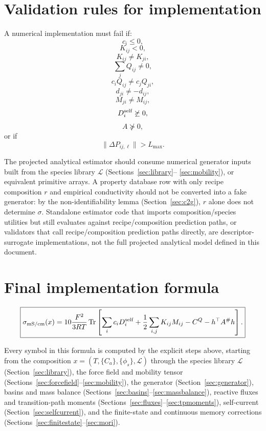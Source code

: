 \documentclass[11pt]{article}
\newcommand{\Tr}{\operatorname{Tr}}
\begin{document}
\section{Validation rules for implementation}

A numerical implementation must fail if:
\[
c_i\le0,
\]
\[
K_{ij}<0,
\]
\[
K_{ij}\ne K_{ji},
\]
\[
\sum_jQ_{ij}\ne0,
\]
\[
c_iQ_{ij}\ne c_jQ_{ji},
\]
\[
d_{ji}\ne-d_{ij},
\]
\[
M_{ji}\ne M_{ij},
\]
\[
D_i^{\rm self}\not\succeq0,
\]
\[
A\not\succeq0,
\]
or if
\[
\|\Delta P_{ij,\ell}\|>L_{\max}.
\]

The projected analytical estimator should consume numerical generator inputs
built from the species library \(\mathcal L\) (Sections~\ref{sec:library}--%
\ref{sec:mobility}), or equivalent primitive arrays. A property database row
with only recipe composition \(r\) and empirical conductivity should not be
converted into a fake generator: by the non-identifiability lemma
(Section~\ref{sec:c2g}), \(r\) alone does not determine \(\sigma\). Standalone
estimator code that imports composition/species utilities but still evaluates
against recipe/composition prediction paths, or validators that call
recipe/composition prediction paths directly, are descriptor-surrogate
implementations, not the full projected analytical model defined in this
document.

\section{Final implementation formula}

\[
\boxed{
\sigma_{\rm mS/cm}(x)
=
10\frac{F^2}{3RT}
\Tr
\left[
\sum_i c_iD_i^{\rm self}
+
\frac12\sum_{i,j}K_{ij}M_{ij}
-
C^Q
-
h^\top A^\#h
\right].
}
\]

Every symbol in this formula is computed by the explicit steps above, starting
from the composition \(x=(T,\{C_a\},\{\phi_s\},\mathcal L)\) through the
species library \(\mathcal L\) (Section~\ref{sec:library}), the force field
and mobility tensor (Sections~\ref{sec:forcefield}--\ref{sec:mobility}), the
generator (Section~\ref{sec:generator}), basins and mass balance
(Sections~\ref{sec:basins}--\ref{sec:massbalance}), reactive fluxes and
transition-path moments (Sections~\ref{sec:fluxes}--\ref{sec:tpmoments}),
self-current (Section~\ref{sec:selfcurrent}), and the finite-state and
continuous memory corrections (Sections~\ref{sec:finitestate}--\ref{sec:mori}).
\end{document}
